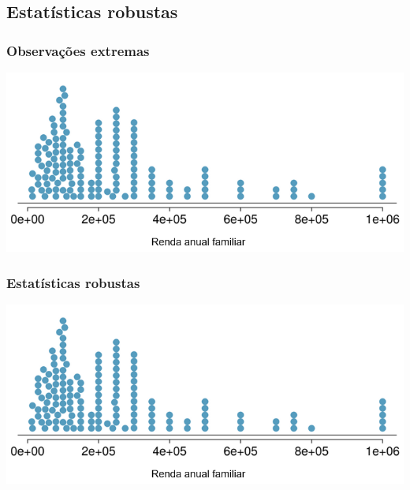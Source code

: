 
\subsection{Estatísticas robustas}


\begin{frame}
\frametitle{Observações extremas}
\justifying
{}

\begin{center}
\includegraphics[width=\textwidth]{1-6_numerical_data/house_income_dot_stacked.png}
\end{center}

\end{frame}


\begin{frame}
\frametitle{Estatísticas robustas}

\begin{center}
\includegraphics[width=\textwidth]{1-6_numerical_data/house_income_dot_stacked.png}
\end{center}
\end{frame}

